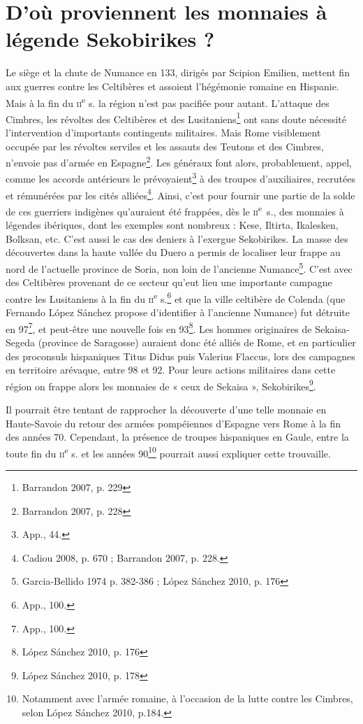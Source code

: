 \documentclass[a4paper,12pt]{article}
\begin{document}
\pagestyle{empty}
\section*{D’où proviennent les monnaies à légende Sekobirikes ?}

Le siège et la chute de Numance en 133, dirigés par Scipion Emilien, mettent fin aux guerres contre 
les Celtibères et assoient l’hégémonie romaine en Hispanie. Mais à la 
fin du \textsc{ii}\textsuperscript{e} s. la région n’est pas pacifiée pour autant.
L’attaque des Cimbres, les révoltes des Celtibères et des Lusitaniens\footnote{Barrandon 2007, p. 229} ont
sans doute nécessité l’intervention d’importants contingents militaires.	
Mais Rome visiblement occupée par les révoltes serviles et les assauts des Teutons
et des Cimbres, n’envoie pas d’armée en Espagne\footnote{Barrandon 2007, p. 228}.
Les généraux font alors, probablement, appel, comme les accords antérieurs le prévoyaient\footnote{App., 44.}
à des troupes d’auxiliaires, recrutées et rémunérées par les cités alliées\footnote{Cadiou 2008, p. 670 ; Barrandon 2007, p. 228.
}.
Ainsi, c’est pour fournir une partie de la solde de ces guerriers indigènes qu’auraient été
frappées, dès le \textsc{ii}\textsuperscript{e}~s., des monnaies à légendes ibériques, dont les exemples
sont nombreux : Kese, Iltirta, Ikalesken, Bolksan, etc. C’est aussi le cas des
deniers à l’exergue Sekobirikes. La masse des découvertes dans la haute
vallée du Duero a permis de localiser leur frappe au nord de l’actuelle province
de Soria, non loin de l’ancienne Numance\footnote{Garcia-Bellido 1974 p. 382-386 ; López Sánchez 2010, p. 176}.
C’est avec des Celtibères provenant
de ce secteur qu’eut lieu une importante campagne contre les Lusitaniens à
la fin du \textsc{ii}\textsuperscript{e} s.\footnote{App., 100.} et que la ville celtibère de Colenda (que Fernando López
Sánchez propose d’identifier à l’ancienne Numance) fut détruite en 97\footnote{App., 100.}, et
peut-être une nouvelle fois en 93\footnote{López Sánchez 2010, p. 176}.
Les hommes originaires de Sekaisa-Segeda (province de Saragosse) auraient donc été alliés de Rome, et en
particulier des proconsuls hispaniques Titus Didus puis Valerius Flaccus, lors
des campagnes en territoire arévaque, entre 98 et 92. Pour leurs actions
militaires dans cette région on frappe alors les monnaies de « ceux de Sekaisa »,
Sekobirikes\footnote{López Sánchez 2010, p. 178}.

Il pourrait être tentant de rapprocher la découverte d’une telle monnaie en
Haute-Savoie du retour des armées pompéiennes d’Espagne vers Rome à la
fin des années 70. Cependant, la présence de troupes hispaniques en Gaule,
entre la toute fin du \textsc{ii}\textsuperscript{e} s. et les années 90\footnote{Notamment avec l’armée romaine, à l’occasion de la lutte contre les Cimbres, selon López Sánchez 2010,
p.184.} pourrait aussi expliquer cette
trouvaille.
\end{document}
